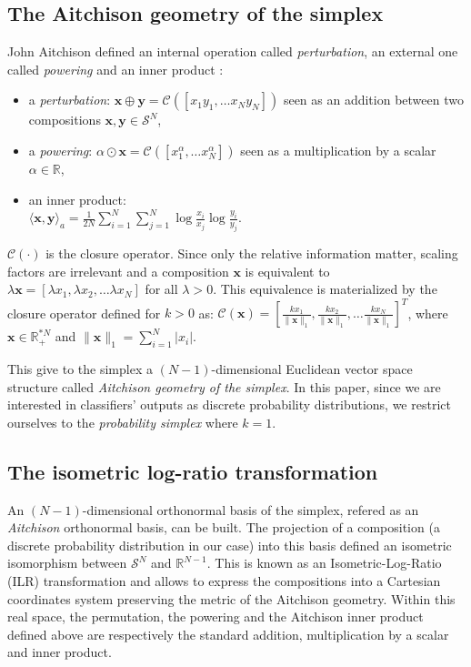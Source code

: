 \documentclass{article}
\theoremstyle{plain}
\theoremstyle{definition}
\theoremstyle{remark}
\begin{document}
\subsection{The Aitchison geometry of the simplex}
John Aitchison defined an internal operation called \emph{perturbation}, an external one called \emph{powering} and an inner product \cite{aitchison2001}:
\begin{itemize}
\item a \emph{perturbation}:
  $\bm{x}\oplus \bm{y} = \mathcal{C}\left([x_1y_1,\dots x_{N}y_{N}]\right)$ seen as an addition between two compositions $\bm{x},\bm{y}\in \mathcal{S}^N$,
\item a \emph{powering}:
  $\alpha \odot \bm{x} = \mathcal{C}\left([x_{1}^{\alpha},\dots x_{N}^{\alpha}]\right)$ seen as a multiplication by a scalar $\alpha \in \mathbb{R}$,
\item an inner product:\\
  $\displaystyle \langle \bm{x},\bm{y} \rangle_a = \frac{1}{2N}\sum_{i=1}^{N} \sum_{j=1}^{N} \log \frac{x_i}{x_j}\log \frac{y_i}{y_j}$.
\end{itemize}
$\mathcal{C}(\cdot)$ is the closure operator. Since only the relative information matter, scaling factors are irrelevant and a composition $\bm{x}$ is equivalent to $\lambda \bm{x} = [\lambda x_1,\lambda x_2,\dots\lambda x_N]$ for all $\lambda>0$. This equivalence is materialized by the closure operator defined for $k>0$ as: $\mathcal{C}\left(\bm{x} \right) = \left[ \frac{k x_1}{\lVert \bm{x} \rVert_1}, \frac{k x_2}{\lVert \bm{x} \rVert_1} ,\dots \frac{k x_N}{\lVert \bm{x} \rVert_1} \right]^T$, where $\bm{x} \in \mathbb{R}_+^{*N}$ and $\displaystyle \lVert \bm{x} \rVert_1 = \sum_{i=1}^N \lvert x_i \rvert$.%

This give to the simplex a $(N-1)$-dimensional Euclidean vector space structure called \emph{Aitchison geometry of the simplex}. In this paper, since we are interested in classifiers' outputs as discrete probability distributions, we restrict ourselves to the \emph{probability simplex} where $k=1$.

\subsection{The isometric log-ratio transformation}

An $(N-1)$-dimensional orthonormal basis of the simplex, refered as an \emph{Aitchison} orthonormal basis, can be built. The projection of a composition (a discrete probability distribution in our case) into this basis defined an isometric isomorphism between $\mathcal{S}^N$ and $\mathbb{R}^{N-1}$. This is known as an Isometric-Log-Ratio (ILR) transformation \cite{egozcue2003isometric} and allows to express the compositions into a Cartesian coordinates system preserving the metric of the Aitchison geometry. Within this real space, the permutation, the powering and the Aitchison inner product defined above are respectively the standard addition, multiplication by a scalar and inner product.
\end{document}
